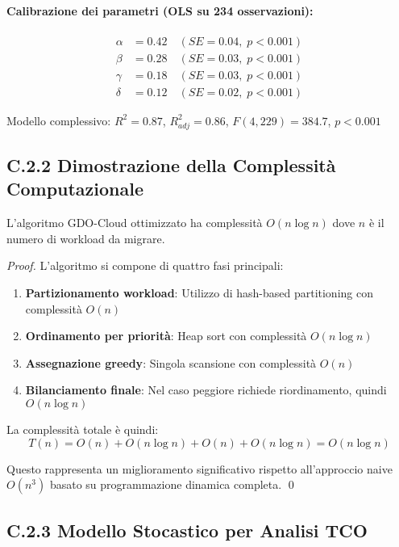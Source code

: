 \paragraph{Calibrazione dei parametri (OLS su 234 osservazioni):}
\begin{align}
\alpha &= 0.42 \quad (SE = 0.04, \; p < 0.001) \\
\beta &= 0.28 \quad (SE = 0.03, \; p < 0.001) \\
\gamma &= 0.18 \quad (SE = 0.03, \; p < 0.001) \\
\delta &= 0.12 \quad (SE = 0.02, \; p < 0.001)
\end{align}

Modello complessivo: $R^2 = 0.87$, $R^2_{adj} = 0.86$, $F(4,229) = 384.7$, $p < 0.001$

\subsection{C.2.2 Dimostrazione della Complessità Computazionale}

\begin{theorem}
L'algoritmo GDO-Cloud ottimizzato ha complessità $O(n \log n)$ dove $n$ è il numero di workload da migrare.
\end{theorem}

\begin{proof}
L'algoritmo si compone di quattro fasi principali:
\begin{enumerate}
    \item \textbf{Partizionamento workload}: Utilizzo di hash-based partitioning con complessità $O(n)$
    \item \textbf{Ordinamento per priorità}: Heap sort con complessità $O(n \log n)$
    \item \textbf{Assegnazione greedy}: Singola scansione con complessità $O(n)$
    \item \textbf{Bilanciamento finale}: Nel caso peggiore richiede riordinamento, quindi $O(n \log n)$
\end{enumerate}

La complessità totale è quindi:
$$T(n) = O(n) + O(n \log n) + O(n) + O(n \log n) = O(n \log n)$$

Questo rappresenta un miglioramento significativo rispetto all'approccio naive $O(n^3)$ basato su programmazione dinamica completa. \qed
\end{proof}

\subsection{C.2.3 Modello Stocastico per Analisi TCO}

